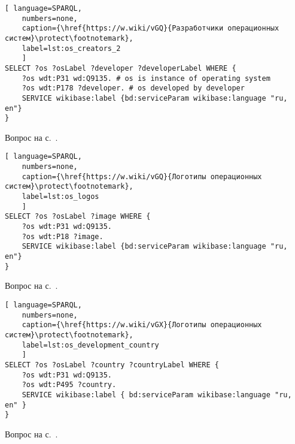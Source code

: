 \newpage
\begin{task}
	\label{answer:os_and_developers}

\begin{lstlisting}[ language=SPARQL, 
    numbers=none,
    caption={\href{https://w.wiki/vGQ}{Разработчики операционных систем}\protect\footnotemark},
    label=lst:os_creators_2
	]
SELECT ?os ?osLabel ?developer ?developerLabel WHERE {
    ?os wdt:P31 wd:Q9135. # os is instance of operating system
    ?os wdt:P178 ?developer. # os developed by developer
    SERVICE wikibase:label {bd:serviceParam wikibase:language "ru, en"}
}\end{lstlisting}

\small{Вопрос на с.~\pageref{tasks:operating_system_tasks}.}
\end{task}


\begin{task}
\label{answer:os_and_logos}

\begin{lstlisting}[ language=SPARQL, 
    numbers=none,
    caption={\href{https://w.wiki/vGQ}{Логотипы операционных систем}\protect\footnotemark},
    label=lst:os_logos
	]
SELECT ?os ?osLabel ?image WHERE {
    ?os wdt:P31 wd:Q9135.
    ?os wdt:P18 ?image.
    SERVICE wikibase:label {bd:serviceParam wikibase:language "ru, en"}
}\end{lstlisting}

\small{Вопрос на с.~\pageref{tasks:operating_system_tasks}.}
\end{task}

\begin{task}
\label{answer:os_country}

\begin{lstlisting}[ language=SPARQL, 
    numbers=none,
    caption={\href{https://w.wiki/vGX}{Логотипы операционных систем}\protect\footnotemark},
	label=lst:os_development_country
	]
SELECT ?os ?osLabel ?country ?countryLabel WHERE {
	?os wdt:P31 wd:Q9135.
	?os wdt:P495 ?country.
	SERVICE wikibase:label { bd:serviceParam wikibase:language "ru, en" }
}\end{lstlisting}

\small{Вопрос на с.~\pageref{tasks:operating_system_tasks}.}
\end{task}



